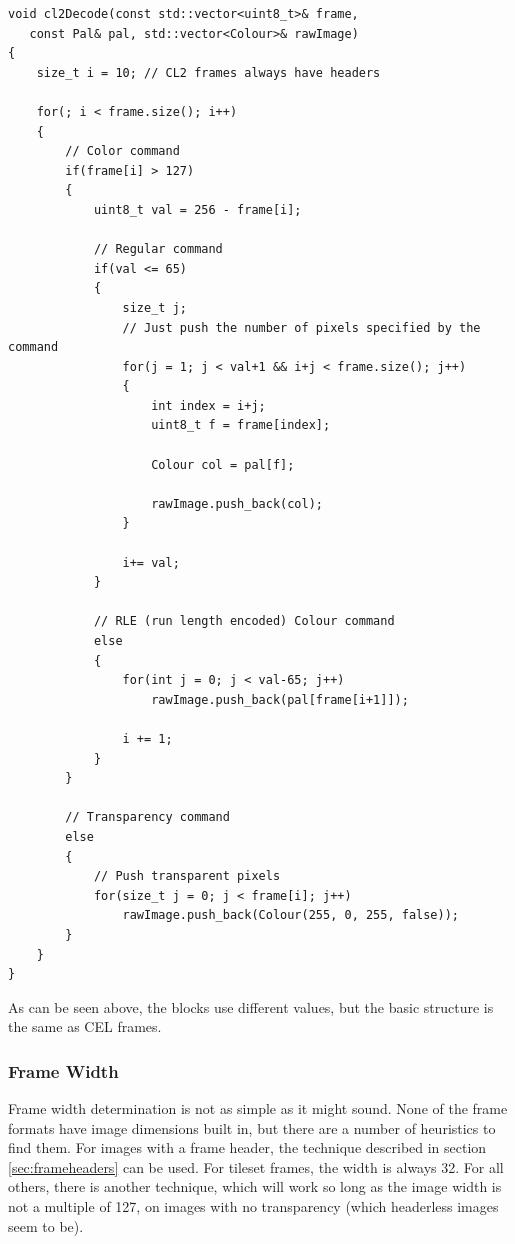 \documentclass[a4paper]{article}
\begin{document}
   \begin{lstlisting}
void cl2Decode(const std::vector<uint8_t>& frame, 
   const Pal& pal, std::vector<Colour>& rawImage)
{
    size_t i = 10; // CL2 frames always have headers

    for(; i < frame.size(); i++)
    {
        // Color command
        if(frame[i] > 127)
        {
            uint8_t val = 256 - frame[i];
           
            // Regular command
            if(val <= 65)
            {
                size_t j;
                // Just push the number of pixels specified by the command
                for(j = 1; j < val+1 && i+j < frame.size(); j++)
                {
                    int index = i+j;
                    uint8_t f = frame[index];

                    Colour col = pal[f];

                    rawImage.push_back(col);
                }
              
                i+= val;
            }

            // RLE (run length encoded) Colour command
            else
            {
                for(int j = 0; j < val-65; j++)
                    rawImage.push_back(pal[frame[i+1]]);
          
                i += 1;
            }
        }
        
        // Transparency command
        else
        {
            // Push transparent pixels
            for(size_t j = 0; j < frame[i]; j++)
                rawImage.push_back(Colour(255, 0, 255, false));
        }
    }
}
   \end{lstlisting}
   
   As can be seen above, the blocks use different values, but the basic structure is the same as CEL frames.
   
 	\subsubsection{Frame Width}
 	Frame width determination is not as simple as it might sound. None of the frame formats have image dimensions built in, but there are a number of heuristics to find them.
 	For images with a frame header, the technique described in section \ref{sec:frameheaders} can be used. 
 	For tileset frames, the width is always 32.
 	For all others, there is another technique, which will work so long as the image width is not a multiple of 127, on images with no transparency (which headerless images seem to be).
 	
\end{document}

